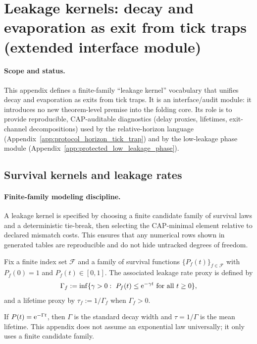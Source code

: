 \section{Leakage kernels: decay and evaporation as exit from tick traps (extended interface module)}
\label{app:leakage_kernel}

\paragraph{Scope and status.}
\AuditTag This appendix defines a finite-family ``leakage kernel'' vocabulary that unifies decay and evaporation as exits from tick traps.
It is an interface/audit module: it introduces no new theorem-level premise into the folding core.
Its role is to provide reproducible, CAP-auditable diagnostics (delay proxies, lifetimes, exit-channel decompositions) used by the relative-horizon language (Appendix~\ref{app:protocol_horizon_tick_trap}) and by the low-leakage phase module (Appendix~\ref{app:protected_low_leakage_phase}).

\subsection{Survival kernels and leakage rates}
\label{subsec:leakage_survival_kernels}

\paragraph{Finite-family modeling discipline.}
\AuditTag A leakage kernel is specified by choosing a finite candidate family of survival laws and a deterministic tie-break, then selecting the CAP-minimal element relative to declared mismatch costs.
This ensures that any numerical rows shown in generated tables are reproducible and do not hide untracked degrees of freedom.

\begin{definition}
\label{def:survival_kernel_family}
Fix a finite index set $\mathcal F$ and a family of survival functions $\{P_f(t)\}_{f\in\mathcal F}$ with $P_f(0)=1$ and $P_f(t)\in[0,1]$.
The associated leakage rate proxy is defined by
\[
\Gamma_f := \inf\{\gamma>0:\ P_f(t)\le \mathrm{e}^{-\gamma t}\ \text{for all }t\ge 0\},
\]
and a lifetime proxy by $\tau_f := 1/\Gamma_f$ when $\Gamma_f>0$.
\end{definition}

\begin{remark}
\label{rem:exponential_reference}
If $P(t)=\mathrm{e}^{-\Gamma t}$, then $\Gamma$ is the standard decay width and $\tau=1/\Gamma$ is the mean lifetime.
This appendix does not assume an exponential law universally; it only uses a finite candidate family.
\end{remark}

